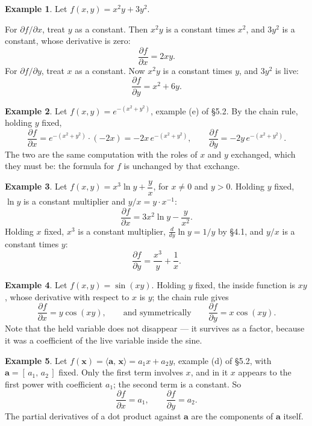 \documentclass[11pt]{article}
\theoremstyle{plain}
\theoremstyle{definition}
\newtheorem{ex}{Example}[section]
\theoremstyle{remark}
\newcommand{\vc}[1]{\mathbf{#1}}
\newcommand{\ip}[2]{\langle #1,\, #2\rangle}
\newcommand{\pd}[2]{\frac{\partial #1}{\partial #2}}
\begin{document}
\begin{center}
\end{center}

\begin{ex}
Let $f(x,y)=x^{2}y+3y^{2}$.

For $\partial f/\partial x$, treat $y$ as a constant. Then $x^{2}y$ is a
constant times $x^{2}$, and $3y^{2}$ is a constant, whose derivative is zero:
\[
  \pd{f}{x}=2xy .
\]
For $\partial f/\partial y$, treat $x$ as a constant. Now $x^{2}y$ is a constant
times $y$, and $3y^{2}$ is live:
\[
  \pd{f}{y}=x^{2}+6y .
\]
\end{ex}

\begin{ex}
Let $f(x,y)=e^{-(x^{2}+y^{2})}$, example (e) of \S5.2. By the chain rule,
holding $y$ fixed,
\[
  \pd{f}{x}=e^{-(x^{2}+y^{2})}\cdot(-2x)=-2x\,e^{-(x^{2}+y^{2})},
  \qquad
  \pd{f}{y}=-2y\,e^{-(x^{2}+y^{2})} .
\]
The two are the same computation with the roles of $x$ and $y$ exchanged, which
they must be: the formula for $f$ is unchanged by that exchange.
\end{ex}

\begin{ex}
Let $f(x,y)=x^{3}\ln y + \dfrac{y}{x}$, for $x\neq0$ and $y>0$. Holding $y$
fixed, $\ln y$ is a constant multiplier and $y/x=y\cdot x^{-1}$:
\[
  \pd{f}{x} = 3x^{2}\ln y - \frac{y}{x^{2}} .
\]
Holding $x$ fixed, $x^{3}$ is a constant multiplier, $\tfrac{d}{dy}\ln y=1/y$ by
\S4.1, and $y/x$ is a constant times $y$:
\[
  \pd{f}{y} = \frac{x^{3}}{y} + \frac{1}{x} .
\]
\end{ex}

\begin{ex}
Let $f(x,y)=\sin(xy)$. Holding $y$ fixed, the inside function is $xy$, whose
derivative with respect to $x$ is $y$; the chain rule gives
\[
  \pd{f}{x}=y\cos(xy),
  \qquad\text{and symmetrically}\qquad
  \pd{f}{y}=x\cos(xy) .
\]
Note that the held variable does not disappear --- it survives as a factor,
because it was a coefficient of the live variable inside the sine.
\end{ex}

\begin{ex}
Let $f(\vc{x})=\ip{\vc{a}}{\vc{x}}=a_1x+a_2y$, example (d) of \S5.2, with
$\vc{a}=[\,a_1,\,a_2\,]$ fixed. Only the first term involves $x$, and in it $x$
appears to the first power with coefficient $a_1$; the second term is a
constant. So
\[
  \pd{f}{x}=a_1,
  \qquad
  \pd{f}{y}=a_2 .
\]
The partial derivatives of a dot product against $\vc{a}$ are the components of
$\vc{a}$ itself.
\end{ex}
\end{document}
